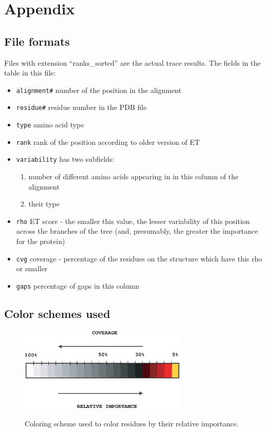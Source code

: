 \section{Appendix}
\subsection{File formats}
Files with extension ``ranks\_sorted''  are the actual trace results.
The fields in the table in this file:
\begin{itemize}
\item {\tt alignment\#}     number of the position in the alignment
\item {\tt residue\#}        residue number in the PDB file
\item {\tt type}            amino acid type
\item {\tt rank}            rank of the position according to older version of ET
\item {\tt variability}     has two subfields:
  \begin{enumerate}
                \item number of different amino acids appearing in
                    in this column  of the alignment
                \item  their type
  \end{enumerate}
		  
\item {\tt rho}             ET score - the smaller this value, the lesser variability
                of this position across the branches of the tree
                (and, presumably, the greater the importance for the protein)
\item {\tt cvg}             coverage - percentage of the residues on the structure which
                have this rho or smaller
\item {\tt gaps}            percentage of gaps in this column
\end{itemize}

\subsection{Color schemes used}
\begin{figure} [t]
{
  \center
  \includegraphics[width=80mm] {colorbar_horizontal.eps}
}
\caption{\label{colorbar} Coloring scheme used to color residues by their relative importance.}
\end{figure}

